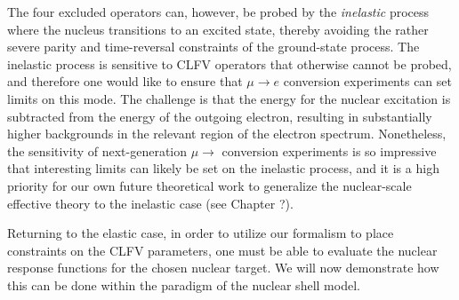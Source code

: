 \documentclass{book}[letterpaper,12pt]
\begin{document}
The four excluded operators can, however, be probed by the \textit{inelastic} process where the nucleus transitions to an excited state, thereby avoiding the rather severe parity and time-reversal constraints of the ground-state process. The inelastic process is sensitive to CLFV operators that otherwise cannot be probed, and therefore one would like to ensure that $\mu\rightarrow e$ conversion experiments can set limits on this mode. The challenge is that the energy for the nuclear excitation is subtracted from the energy of the outgoing electron, resulting in substantially higher backgrounds in the relevant region of the electron spectrum. Nonetheless, the sensitivity of next-generation $\mu\rightarrow$ conversion experiments is so impressive that interesting limits can likely be set on the inelastic process, and it is a high priority for our own future theoretical work to generalize the nuclear-scale effective theory to the inelastic case (see Chapter ?).

Returning to the elastic case, in order to utilize our formalism to place constraints on the CLFV parameters, one must be able to evaluate the nuclear response functions for the chosen nuclear target. We will now demonstrate how this can be done within the paradigm of the nuclear shell model.
\end{document}
